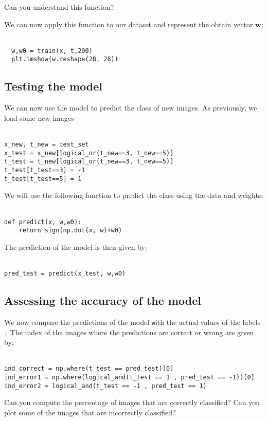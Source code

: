 \documentclass{article}
\newcommand{\mintinline}[1]{\colorbox{bg}{\lstinline[basicstyle=\ttfamily]{#1}}}
\begin{document}
Can you understand this function?

We can now apply this function to our dataset and represent the obtain vector $\mathbf{w}$:\\ \ \\
\begin{verbatim}
  w,w0 = train(x, t,200)
  plt.imshow(w.reshape(28, 28))
\end{verbatim}

\subsection{Testing the model}
We can now use the model to predict the class of new images. As previously, we load some new images \\ \ \\
\begin{verbatim}
x_new, t_new = test_set
x_test = x_new[logical_or(t_new==3, t_new==5)]
t_test = t_new[logical_or(t_new==3, t_new==5)]
t_test[t_test==3] = -1
t_test[t_test==5] = 1
\end{verbatim}

We will use the following function to predict the class using the data and weights:\\ \ \\
\begin{verbatim}
def predict(x, w,w0):
    return sign(np.dot(x, w)+w0)
\end{verbatim}

The prediction of the model is then given by:\\ \ \\
\begin{verbatim}
pred_test = predict(x_test, w,w0)
\end{verbatim}

\subsection{Assessing the accuracy of the model}
We now compare the predictions of the model \texttt with the actual values of the labels \texttt. The index of the images where the predictions are correct or wrong are given by: \\ \ \\
\begin{verbatim}
ind_correct = np.where(t_test == pred_test)[0]
ind_error1 = np.where(logical_and(t_test == 1 , pred_test == -1))[0]
ind_error2 = logical_and(t_test == -1 , pred_test == 1)
\end{verbatim}

Can you compute the percentage of images that are correctly classified? Can you plot some of the images that are incorrectly classified?
\end{document}
